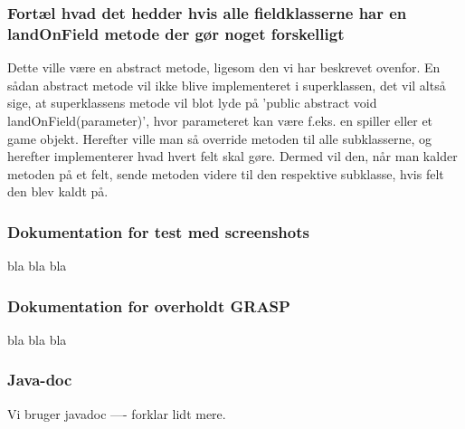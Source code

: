 \subsubsection{Fortæl hvad det hedder hvis alle fieldklasserne har en landOnField metode der gør noget forskelligt}
Dette ville være en abstract metode, ligesom den vi har beskrevet ovenfor. En sådan abstract metode vil ikke blive implementeret i superklassen, det vil altså sige, at superklassens metode vil blot lyde på 'public abstract void landOnField(parameter)', hvor parameteret kan være f.eks. en spiller eller et game objekt. Herefter ville man så override metoden til alle subklasserne, og herefter implementerer hvad hvert felt skal gøre. Dermed vil den, når man kalder metoden på et felt, sende metoden videre til den respektive subklasse, hvis felt den blev kaldt på.

\subsubsection{Dokumentation for test med screenshots}
bla bla bla

\subsubsection{Dokumentation for overholdt GRASP}
bla bla bla

\subsubsection{Java-doc}
Vi bruger javadoc ---- forklar lidt mere.
